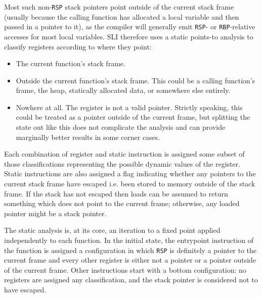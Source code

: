 \documentclass[12pt,a4paper]{book}
\begin{document}
Most such non-\verb|RSP| stack pointers point outside of the current stack frame (usually because the calling function has allocated a local variable and then passed in a pointer to it), as the compiler will generally emit \verb|RSP|- or \verb|RBP|-relative accesses for most local variables.
SLI therefore uses a static points-to analysis to classify registers according to where they point:

\begin{itemize}
\item
  The current function's stack frame.
\item
  Outside the current function's stack frame.
  This could be a calling function's frame, the heap, statically allocated data, or somewhere else entirely.
\item
  Nowhere at all.
  The register is not a valid pointer.
  Strictly speaking, this could be treated as a pointer outside of the current frame, but splitting the state out like this does not complicate the analysis and can provide marginally better results in some corner cases.
\end{itemize}

Each combination of register and static instruction is assigned some subset of those classifications representing the possible dynamic values of the register.
Static instructions are also assigned a flag indicating whether any pointers to the current stack frame have escaped i.e. been stored to memory outside of the stack frame.
If the stack has not escaped then loads can be assumed to return something which does not point to the current frame; otherwise, any loaded pointer might be a stack pointer.

The static analysis is, at its core, an iteration to a fixed point applied independently to each function.
In the initial state, the entrypoint instruction of the function is assigned a configuration in which \verb|RSP| is definitely a pointer to the current frame and every other register is either not a pointer or a pointer outside of the current frame.
Other instructions start with a bottom configuration: no registers are assigned any classification, and the stack pointer is considered not to have escaped.


\end{document}
